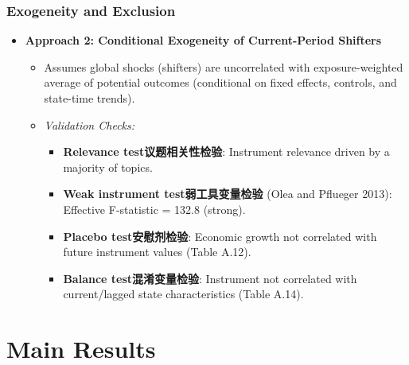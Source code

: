 \documentclass{beamer}
\begin{document}
\begin{frame}
    \frametitle{Exogeneity and Exclusion}
    \footnotesize
    \begin{itemize}
        \item \textbf{Approach 2: Conditional Exogeneity of Current-Period Shifters}
        \begin{itemize}
            \item Assumes global shocks (shifters) are uncorrelated with exposure-weighted average of potential outcomes (conditional on fixed effects, controls, and state-time trends).
            \item \textit{Validation Checks:}
            \begin{itemize}
                \item \textbf {Relevance test议题相关性检验}: Instrument relevance driven by a majority of topics.
                \item \textbf {Weak instrument test弱工具变量检验} (Olea and Pflueger 2013): Effective F-statistic = 132.8 (strong).
                \item \textbf {Placebo test安慰剂检验}: Economic growth not correlated with future instrument values (Table A.12).
                \item \textbf {Balance test混淆变量检验}: Instrument not correlated with current/lagged state characteristics (Table A.14).
            \end{itemize}
        \end{itemize}
    \end{itemize}
\end{frame}

\section{Main Results}
\end{document}

